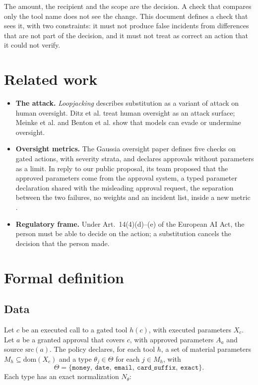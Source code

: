 \documentclass[11pt,a4paper]{article}
\begin{document}
The amount, the recipient and the scope are the decision. A check that compares only the tool name does not see
the change. This document defines a check that sees it, with two constraints: it must not produce false
incidents from differences that are not part of the decision, and it must not treat as correct an action that it
could not verify.

\section{Related work}

\begin{itemize}
  \item \textbf{The attack.} \emph{Loopjacking} \cite{loopjacking} describes substitution as a variant of attack
    on human oversight. Ditz et al. \cite{ditz2025} treat human oversight as an attack surface; Meinke et al.
    \cite{meinke2024} and Benton et al. \cite{benton2024} show that models can evade or undermine oversight.
  \item \textbf{Oversight metrics.} The Gaussia oversight paper \cite{gaussia2026} defines five checks on gated
    actions, with severity strata, and declares approvals without parameters as a limit. In reply to our public
    proposal, its team proposed that the approved parameters come from the approval system, a typed parameter
    declaration shared with the misleading approval request, the separation between the two failures, no weights
    and an incident list, inside a new metric \cite{gaussiadisc}.
  \item \textbf{Regulatory frame.} Under Art.~14(4)(d)--(e) of the European AI Act, the person must be able to
    decide on the action; a substitution cancels the decision that the person made.
\end{itemize}

\section{Formal definition}

\subsection{Data}

Let $c$ be an executed call to a gated tool $h(c)$, with executed parameters $X_c$. Let $a$ be a granted approval
that covers $c$, with approved parameters $A_a$ and source $\mathrm{src}(a)$. The policy declares, for each tool
$h$, a set of material parameters $M_h \subseteq \mathrm{dom}(X_c)$ and a type $\theta_j \in \Theta$ for each
$j \in M_h$, with
\begin{equation}
  \Theta = \{\texttt{money},\ \texttt{date},\ \texttt{email},\ \texttt{card\_suffix},\ \texttt{exact}\}.
\end{equation}
Each type has an exact normalization $N_\theta$:
\end{document}
